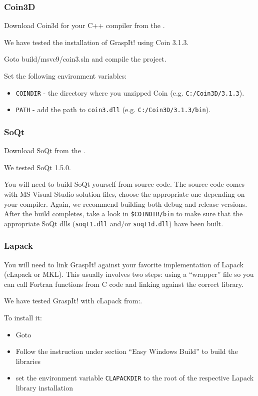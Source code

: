 \subsubsection{Coin3D}

Download Coin3d for your C++ compiler from the .

We have tested the installation of GraspIt! using Coin 3.1.3.

Goto build/msvc9/coin3.sln and compile the project.

Set the following environment variables:


\begin{itemize}
\item \texttt{COINDIR} - the directory where you unzipped Coin (e.g. \texttt{C:/Coin3D/3.1.3}).
\item \texttt{PATH} - add the path to \texttt{coin3.dll} (e.g. \texttt{C:/Coin3D/3.1.3/bin}).
\end{itemize}

\subsubsection{SoQt}

Download SoQt from the .

We tested SoQt 1.5.0.

You will need to build SoQt yourself from source code. The source code
comes with MS Visual Studio solution files, choose the appropriate one
depending on your compiler. Again, we recommend building both debug
and release versions. After the build completes, take a look in
\texttt{\$COINDIR/bin} to make sure that the appropriate SoQt dlls (\texttt{soqt1.dll} and/or \texttt{soqt1d.dll}) have been built.

\subsubsection{Lapack}

You will need to link GraspIt! against your favorite implementation of
Lapack (cLapack or MKL).  This usually involves two steps: using a ``wrapper'' file so
you can call Fortran functions from C code and linking against the
correct library.

We have tested GraspIt! with cLapack from:.

To install it:
\begin{itemize}
\item Goto 
\item Follow the instruction under section ``Easy Windows Build'' to build the libraries
\item set the environment variable \texttt{CLAPACKDIR} to the root of the respective Lapack library installation
\end{itemize}

